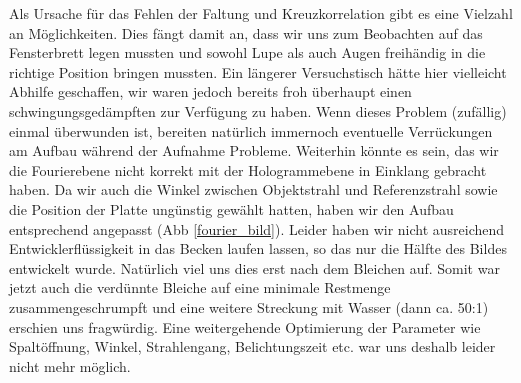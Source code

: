 Als Ursache für das Fehlen der Faltung und Kreuzkorrelation gibt es eine Vielzahl an Möglichkeiten. Dies fängt damit an, dass wir uns zum Beobachten auf das Fensterbrett legen mussten und sowohl Lupe als auch Augen freihändig in die richtige Position bringen mussten. Ein längerer Versuchstisch hätte hier vielleicht Abhilfe geschaffen, wir waren jedoch bereits froh überhaupt einen schwingungsgedämpften zur Verfügung zu haben. Wenn dieses Problem (zufällig) einmal überwunden ist, bereiten natürlich immernoch eventuelle Verrückungen am Aufbau während der Aufnahme Probleme. Weiterhin könnte es sein, das wir die Fourierebene nicht korrekt mit der Hologrammebene in Einklang gebracht haben.
Da wir auch die Winkel zwischen Objektstrahl und Referenzstrahl sowie die Position der Platte ungünstig gewählt hatten, haben wir den Aufbau entsprechend angepasst (Abb \ref{fourier_bild}). Leider haben wir nicht ausreichend Entwicklerflüssigkeit in das Becken laufen lassen, so das nur die Hälfte des Bildes entwickelt wurde. Natürlich viel uns dies erst nach dem Bleichen auf. Somit war jetzt auch die verdünnte Bleiche auf eine minimale Restmenge zusammengeschrumpft und eine weitere Streckung mit Wasser (dann ca. 50:1) erschien uns fragwürdig. Eine weitergehende Optimierung der Parameter wie Spaltöffnung, Winkel, Strahlengang, Belichtungszeit etc. war uns deshalb leider nicht mehr möglich.